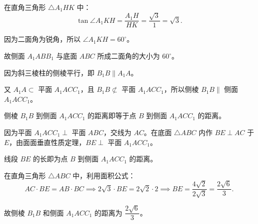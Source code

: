 \begin{answer}
在直角三角形 $\triangle A_1HK$ 中：
\nopagebreak[4]
\[
\tan\angle A_1KH = \frac{A_1H}{HK} = \frac{\sqrt3}{1} = \sqrt3.
\]

因为二面角为锐角，所以 $\angle A_1KH = 60^\circ$。

故侧面 $A_1ABB_1$ 与底面 $ABC$ 所成二面角的大小为 $60^\circ$。


因为斜三棱柱的侧棱平行，即 $B_1B \parallel A_1A$。

又 $A_1A \subset$ 平面 $A_1ACC_1$，且 $B_1B \not\subset$ 平面 $A_1ACC_1$，所以侧棱 $B_1B \parallel$ 侧面 $A_1ACC_1$。

侧棱 $B_1B$ 到侧面 $A_1ACC_1$ 的距离即等于点 $B$ 到侧面 $A_1ACC_1$ 的距离。

因为平面 $A_1ACC_1 \perp$ 平面 $ABC$，交线为 $AC$。在底面 $\triangle ABC$ 内作 $BE \perp AC$ 于 $E$，由面面垂直性质定理，$BE \perp$ 平面 $A_1ACC_1$。

线段 $BE$ 的长即为点 $B$ 到侧面 $A_1ACC_1$ 的距离。

在直角三角形 $\triangle ABC$ 中，利用面积公式：
\nopagebreak[4]
\[
AC \cdot BE = AB \cdot BC \implies 2\sqrt3 \cdot BE = 2\sqrt2 \cdot 2 \implies BE = \frac{4\sqrt2}{2\sqrt3} = \frac{2\sqrt6}{3}.
\]

故侧棱 $B_1B$ 和侧面 $A_1ACC_1$ 的距离为 $\dfrac{2\sqrt6}{3}$。




\end{answer}
